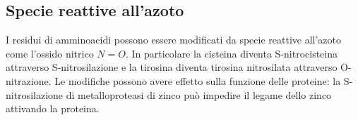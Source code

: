 	\subsection{Specie reattive all'azoto}
	I residui di amminoacidi possono essere modificati da specie reattive all'azoto come l'ossido nitrico \emph{$N=O$}.
	In particolare la cisteina diventa S-nitrocisteina attraverso S-nitrosilazione e la tirosina diventa tirosina nitrosilata attraverso O-nitrazione.
	Le modifiche possono avere effetto sulla funzione delle proteine: la S-nitrosilazione di metalloproteasi di zinco pu\`o impedire il legame dello zinco attivando la proteina.
	
